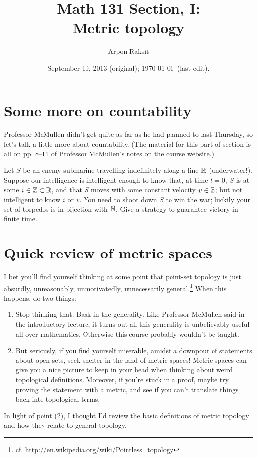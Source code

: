


\title{Math 131 Section, I:\\Metric topology}
\author{Arpon Raksit}
\date{September 10, 2013 (original); \today\ (last edit).}


\maketitle
\thispagestyle{fancy}


\section{Some more on countability}

Professor McMullen didn't get quite as far as he had planned to last
Thursday, so let's talk a little more about countability. (The
material for this part of section is all on pp. 8--11 of Professor
McMullen's notes on the course website.)

\begin{exercise}
  Let $S$ be an enemy submarine travelling indefinitely along a line
  $\mathbb{R}$ (underwater!). Suppose our intelligence is intelligent enough
  to know that, at time $t=0$, $S$ is at some $i \in \mathbb{Z} \subset \mathbb{R}$,
  and that $S$ moves with some constant velocity $v \in \mathbb{Z}$; but not
  intelligent to know $i$ or $v$. You need to shoot down $S$ to win
  the war; luckily your set of torpedos is in bijection with
  $\mathbb{N}$. Give a strategy to guarantee victory in finite time.
\end{exercise}


\section{Quick review of metric spaces}

I bet you'll find yourself thinking at some point that point-set
topology is just absurdly, unreasonably, unmotivatedly, unnecessarily
general.\footnote{cf.
  \url{http://en.wikipedia.org/wiki/Pointless_topology}} When this
happens, do two things:
\begin{enumerate}
\item Stop thinking that. Bask in the generality. Like Professor
  McMullen said in the introductory lecture, it turns out all this
  generality is unbelievably useful all over mathematics. Otherwise
  this course probably wouldn't be taught.
\item But seriously, if you find yourself miserable, amidst a downpour
  of statements about open sets, seek shelter in the land of metric
  spaces! Metric spaces can give you a nice picture to keep in your
  head when thinking about weird topological definitions. Moreover, if
  you're stuck in a proof, maybe try proving the statement with a
  metric, and see if you can't translate things back into topological
  terms.
\end{enumerate}
In light of point (2), I thought I'd review the basic definitions of
metric topology and how they relate to general topology.

